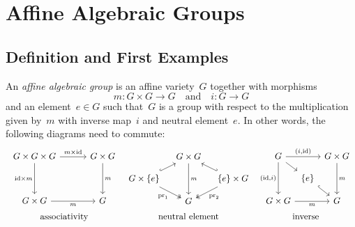 \chapter{Affine Algebraic Groups}





\section{Definition and First Examples}

\begin{definition}
  An \emph{affine algebraic group} is an affine variety~$G$ together with morphisms
  \[
            m
    \colon  G \times G
    \to     G
    \quad\text{and}\quad
            i
    \colon  G
    \to     G
  \]
  and an element~$e \in G$ such that~$G$ is a group with respect to the multiplication given by~$m$ with inverse map~$i$ and neutral element~$e$.
  In other words, the following diagrams need to commute:
  \[
    \renewcommand{\arraystretch}{1.5}
    \renewcommand{\arraycolsep}{3.3pt}
    \begin{array}{ccc}
        \begin{tikzcd}[column sep = 30pt, row sep = 35pt]
            G \times G \times G
            \arrow{r}[above]{m \times {\id}}
            \arrow{d}[left]{{\id} \times m}
          & G \times G
            \arrow{d}[right]{m}
          \\
            G \times G
            \arrow{r}[below]{m}
          & G
        \end{tikzcd}
      &
        \begin{tikzcd}[column sep = 10pt, row sep = 9pt]
            {}
          & G \times G
            \arrow{dd}[right]{m}
          & {}
          \\
            G \times \{e\}
            \arrow[hook]{ur}
            \arrow[two heads]{dr}[below left]{\operatorname{pr}_1}
          & {}
          & \{e\} \times G
            \arrow[hook']{ul}
            \arrow[two heads]{dl}[below right]{\operatorname{pr}_2}
          \\
            {}
          & G
          & {}
        \end{tikzcd}
      &
        \begin{tikzcd}[column sep = 3pt, row sep = 9pt]
            G
            \arrow{rr}[above]{(i,\id)}
            \arrow{dd}[left]{(\id,i)}
            \arrow{dr}
          & {}
          & G \times G
            \arrow{dd}[right]{m}
          \\
            {}
          & \{e\}
            \arrow[hook]{dr}
          & {}
          \\
            G \times G
            \arrow{rr}[below]{m}
          & {}
          & G
        \end{tikzcd}
    \\
        \text{associativity}
      & \text{neutral element}
      & \text{inverse}
    \end{array}
  \]
\end{definition}


